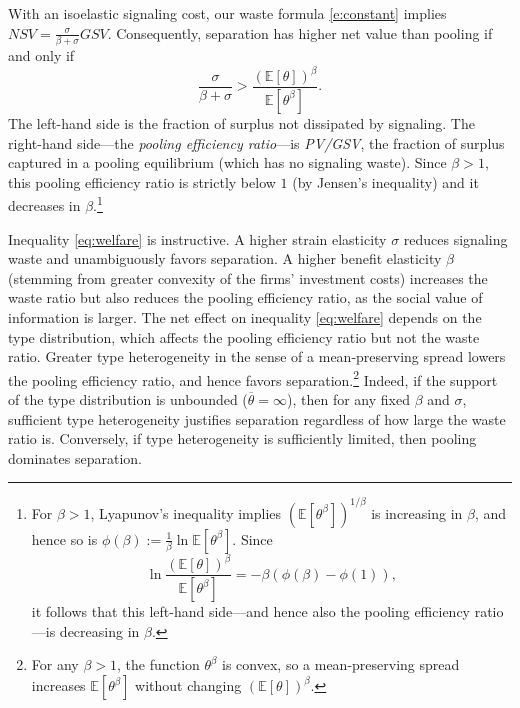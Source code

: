 \documentclass[12 pt]{article}
\theoremstyle{remark}
\theoremstyle{definition}
\newtheorem{example}{Example}
\newcommand{\E}{\mathbb{E}}
\def\typemax{\overline \theta}
\let\oldfootnote\footnote
\renewcommand\footnote[1]{\oldfootnote{\hspace{.5mm}#1}}
\begin{document}
With an isoelastic signaling cost, our waste formula \eqref{e:constant} implies $\mathit{NSV} = \frac{\sigma}{\beta+\sigma}{GSV}$. Consequently, separation has higher net value than pooling if and only if
\begin{equation}
\label{eq:welfare}
\frac{\sigma}{\beta + \sigma} > \frac{(\E[\theta])^\beta}{\E[\theta^\beta]}.
\end{equation}
The left-hand side is the fraction of surplus not dissipated by signaling. The right-hand side---the \emph{pooling efficiency ratio}---is \textit{PV/GSV}, the fraction of surplus captured in a pooling equilibrium (which has no signaling waste). Since $\beta>1$, this pooling efficiency ratio is strictly below $1$ (by Jensen's inequality) and it decreases in $\beta$.\footnote{For $\beta > 1$, Lyapunov's inequality implies $\left(\E[\theta^\beta]\right)^{1 / \beta}$ is increasing in $\beta$, and hence so is $\phi(\beta):=\frac{1}{\beta} \ln \E[\theta^\beta]$. Since
\[
\ln \frac{(\E[\theta])^\beta}{\E[\theta^\beta]}=-\beta(\phi(\beta)-\phi(1)),
\]
it follows that this left-hand side---and hence also the pooling efficiency ratio---is decreasing in $\beta$.}

Inequality \eqref{eq:welfare} is instructive. A higher strain elasticity $\sigma$ reduces signaling waste and unambiguously favors separation. A higher benefit elasticity $\beta$ (stemming from greater convexity of the firms' investment costs) increases the waste ratio but also reduces the pooling efficiency ratio, as the social value of information is larger. The net effect on inequality \eqref{eq:welfare} depends on the type distribution, which affects the pooling efficiency ratio but not the waste ratio. Greater type heterogeneity in the sense of a mean-preserving spread lowers the pooling efficiency ratio, and hence favors separation.\footnote{For any $\beta>1$, the function $\theta^\beta$ is convex, so a mean-preserving spread increases $\E[\theta^\beta]$ without changing $(\E[\theta])^\beta$.} Indeed, if the support of the type distribution is unbounded ($\typemax=\infty$), then for any fixed $\beta$ and $\sigma$, sufficient type heterogeneity justifies separation regardless of how large the waste ratio is. Conversely, if type heterogeneity is sufficiently limited, then pooling dominates separation.

\end{document}
